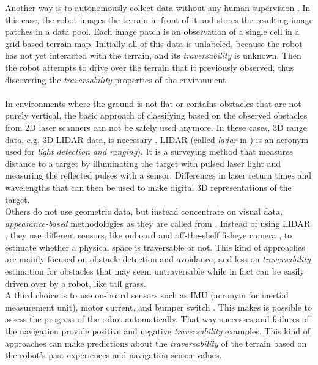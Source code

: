 \documentclass[12pt,a4paper]{report}
\newcommand{\term}{\textit}
\newcommand{\acronym}{\MakeUppercase}
\begin{document}
	Another way is to autonomously collect data without any human supervision 
	\cite{Kim}. In this case, the robot images the terrain in front of it and stores 
	the resulting image patches in a data pool. Each image patch is an observation 
	of a single cell in a grid-based terrain map. Initially all of this data is 
	unlabeled, because the robot has not yet interacted with the terrain, and its 
	\term{traversability} is unknown. Then the robot attempts to drive over the 
	terrain that it previously observed, thus discovering the \term{traversability} 
	properties of the environment.
	\\\\
	
	In environments where the ground is not flat or contains obstacles that are 
	not purely vertical, the basic approach of classifying based on the observed 
	obstacles from \acronym{2d} laser scanners can not be safely used anymore. 
	In these cases, \acronym{3d} range data, e.g. \acronym{3d} \acronym{lidar} 
	data, is necessary \cite{Suger, Lalonde}. \acronym{lidar} (called \term{ladar} 
	in \cite{Lalonde, Shneier}) is an acronym used for \term{light detection and 
	ranging}). It is a surveying method that measures distance to a target by 
	illuminating the target with pulsed laser light and measuring the reflected 
	pulses with a sensor. Differences in laser return times and wavelengths that 
	can then be used to make digital \acronym{3d} representations of the target.
	\\
	
	Others do not use geometric data, but instead concentrate on visual data, 
	\term{appearance-based} methodologies as they are called from \cite{Papadakis}. 
	Instead of using \acronym{lidar} \cite{Lalonde, Suger}, they use different 
	sensors, like onboard and off-the-shelf fisheye camera \cite{Hirose}, to 
	estimate whether a physical space is traversable or not. This kind of 
	approaches are mainly focused on obstacle detection and avoidance, and less 
	on \term{traversability} estimation for obstacles that may seem untraversable 
	while in fact can be easily driven over by a robot, like tall grass.
	\\
	
	A third choice is to use on-board sensors such as \acronym{imu} (acronym for 
	inertial measurement unit), motor current, and bumper switch \cite{Kim}. This 
	makes is possible to assess the progress of the robot automatically. That way 
	successes and failures of the navigation provide positive and  negative 
	\term{traversability} examples. This kind of approaches can make predictions 
	about the \term{traversability} of the terrain based on the robot's past 
	experiences and navigation sensor values.
	\\
	
\end{document}
